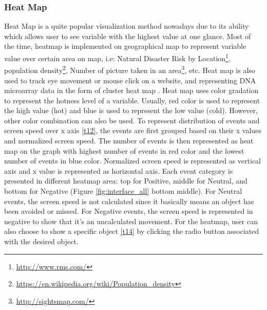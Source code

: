 \documentclass{vgtc}                          %
\begin{document}
\subsubsection{Heat Map}

Heat Map is a quite popular visualization method nowadays due to its ability which allows user to see variable with the highest value at one glance. Most of the time, heatmap is implemented on geographical map to represent variable value over certain area on map, i.e: Natural Disaster Risk by Location\footnote{\url{http://www.rms.com/}}, population density\footnote{\url{https://en.wikipedia.org/wiki/Population_density}}, Number of picture taken in an area\footnote{\url{http://sightsmap.com/}}, etc. Heat map is also used to track eye movement or mouse click on a website, and representing DNA microarray data in the form of cluster heat map \cite{friendly}. Heat map uses color gradation to represent the hotness level of a variable. Usually, red color is used to represent the high value (hot) and blue is used to represent the low value (cold). However, other color combination can also be used. To represent distribution of events and screen speed over x axis \ref{t12}, the events are first grouped based on their x values and normalized screen speed. The number of events is then represented as heat map on the graph with highest number of events in red color and the lowest number of events in blue color. Normalized screen speed is represented as vertical axis and x value is represented as horizontal axis. Each event category is presented in different heatmap area: top for Positive, middle for Neutral, and bottom for Negative (Figure \ref{fig:interface_all} bottom middle). For Neutral events, the screen speed is not calculated since it basically means an object has been avoided or missed. For Negative events, the screen speed is represented in negative to show that it's an uncalculated movement. For the heatmap, user can also choose to show a specific object \ref{t14} by clicking the radio button associated with the desired object. 
\end{document}
